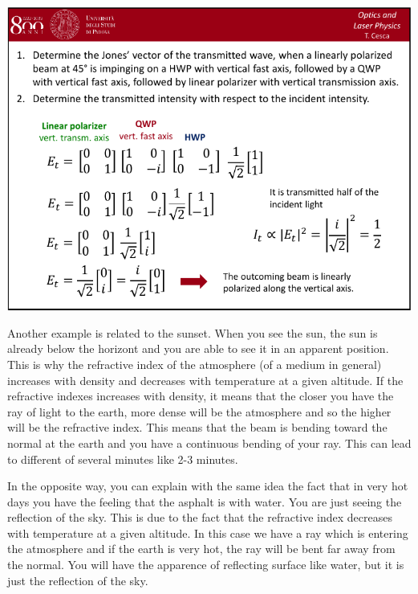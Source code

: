 \documentclass[../main/main.tex]{subfiles}
\begin{document}
\begin{minipage}[]{0.5\linewidth}
\centering
\includegraphics[page=7,width=1\textwidth]{../lessons/pdf_file/04_lecture.pdf}
\end{minipage}
\hspace{0.3cm}\vspace{0.3cm}
\begin{minipage}[c]{0.47\linewidth}

Another example is related to the sunset. When you see the sun, the sun is already below the horizont and you are able to see it in an apparent position. This is why the refractive index of the atmosphere (of a medium in general) increases with density and decreases with temperature at a given altitude. If the refractive indexes increases with density, it means that the closer you have the ray of light to the earth, more dense will be the atmosphere and so the higher will be the refractive index. This means that the beam is bending toward the normal at the earth and you have a continuous bending of your ray. This can lead to different of several minutes like 2-3 minutes.
\end{minipage}

In the opposite way, you can explain with the same idea the fact that in very hot days you have the feeling that the asphalt is with water. You are just seeing the reflection of the sky. This is due to the fact that the refractive index decreases with temperature at a given altitude. In this case we have a ray which is entering the atmosphere and if the earth is very hot, the ray will be bent far away from the normal. You will have the apparence of reflecting surface like water, but it is just the reflection of the sky.
\end{document}
